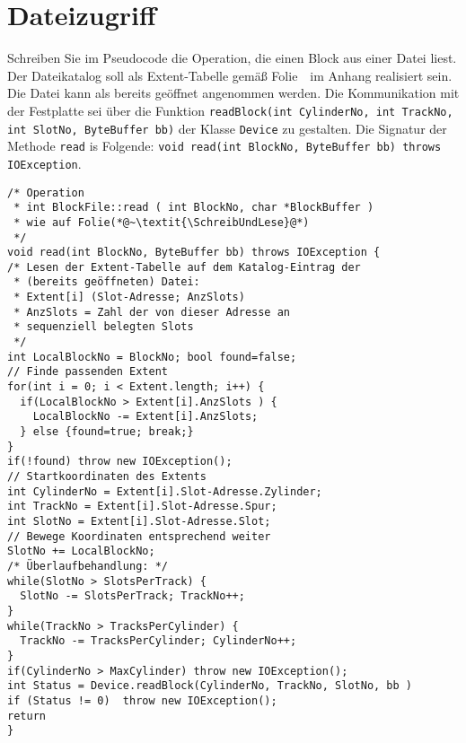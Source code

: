 \section{Dateizugriff}
Schreiben Sie im Pseudocode die Operation, die einen Block aus einer Datei liest.
Der Dateikatalog soll als Extent-Tabelle gemäß Folie~\KatalogeintraegeVier~im Anhang realisiert sein.
Die Datei kann als bereits geöffnet angenommen werden.
Die Kommunikation mit der Festplatte sei über die Funktion \texttt{readBlock(int CylinderNo, int TrackNo, int SlotNo, ByteBuffer bb)} der Klasse \texttt{Device} zu gestalten.
Die Signatur der Methode \texttt{read} is Folgende: \texttt{void read(int BlockNo, ByteBuffer bb) throws IOException{}}.

\cprotEnv
\begin{note}
\begin{lstlisting}[]
/* Operation
 * int BlockFile::read ( int BlockNo, char *BlockBuffer )
 * wie auf Folie(*@~\textit{\SchreibUndLese}@*)
 */
void read(int BlockNo, ByteBuffer bb) throws IOException {
/* Lesen der Extent-Tabelle auf dem Katalog-Eintrag der
 * (bereits geöffneten) Datei:
 * Extent[i] (Slot-Adresse; AnzSlots)
 * AnzSlots = Zahl der von dieser Adresse an
 * sequenziell belegten Slots
 */
int LocalBlockNo = BlockNo; bool found=false;
// Finde passenden Extent
for(int i = 0; i < Extent.length; i++) {
  if(LocalBlockNo > Extent[i].AnzSlots ) {
    LocalBlockNo -= Extent[i].AnzSlots;
  } else {found=true; break;}
}
if(!found) throw new IOException();
// Startkoordinaten des Extents
int CylinderNo = Extent[i].Slot-Adresse.Zylinder;
int TrackNo = Extent[i].Slot-Adresse.Spur;
int SlotNo = Extent[i].Slot-Adresse.Slot;
// Bewege Koordinaten entsprechend weiter
SlotNo += LocalBlockNo;
/* Überlaufbehandlung: */
while(SlotNo > SlotsPerTrack) {
  SlotNo -= SlotsPerTrack; TrackNo++;
}
while(TrackNo > TracksPerCylinder) {
  TrackNo -= TracksPerCylinder; CylinderNo++;
}
if(CylinderNo > MaxCylinder) throw new IOException();
int Status = Device.readBlock(CylinderNo, TrackNo, SlotNo, bb )
if (Status != 0)  throw new IOException();
return
}
\end{lstlisting}
\end{note}
